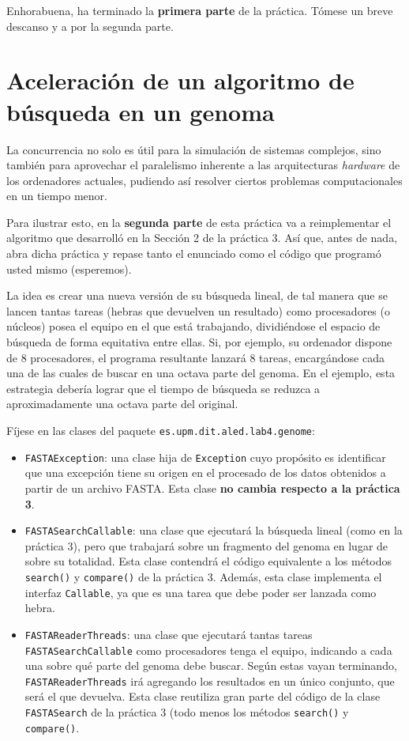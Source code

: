 \documentclass[10pt,a4paper,spanish]{article}
\newcommand{\code}[1]{\texttt{#1}}
\begin{document}
Enhorabuena, ha terminado la \textbf{primera parte} de la práctica. Tómese un breve descanso y a por la segunda parte.

\section{Aceleración de un algoritmo de búsqueda en un genoma}
\label{sec:paralelizacion}

La concurrencia no solo es útil para la simulación de sistemas complejos, sino también para aprovechar el paralelismo inherente a las arquitecturas \textit{hardware} de los ordenadores actuales, pudiendo así resolver ciertos problemas computacionales en un tiempo menor.

Para ilustrar esto, en la \textbf{segunda parte} de esta práctica va a reimplementar el algoritmo que desarrolló en la Sección 2 de la práctica 3. Así que, antes de nada, abra dicha práctica y repase tanto el enunciado como el código que programó usted mismo (esperemos).

La idea es crear una nueva versión de su búsqueda lineal, de tal manera que se lancen tantas tareas (hebras que devuelven un resultado) como procesadores (o núcleos) posea el equipo en el que está trabajando, dividiéndose el espacio de búsqueda de forma equitativa entre ellas. Si, por ejemplo, su ordenador dispone de 8 procesadores, el programa resultante lanzará 8 tareas, encargándose cada una de las cuales de buscar en una octava parte del genoma. En el ejemplo, esta estrategia debería lograr que el tiempo de búsqueda se reduzca a aproximadamente una octava parte del original.

Fíjese en las clases del paquete \code{es.upm.dit.aled.lab4.genome}:

\begin{itemize}
    \item \code{FASTAException}: una clase hija de \code{Exception} cuyo propósito es identificar que una excepción tiene su origen en el procesado de los datos obtenidos a partir de un archivo FASTA. Esta clase \textbf{no cambia respecto a la práctica 3}.
    \item \code{FASTASearchCallable}: una clase que ejecutará la búsqueda lineal (como en la práctica 3), pero que trabajará sobre un fragmento del genoma en lugar de sobre su totalidad. Esta clase contendrá el código equivalente a los métodos \code{search()} y \code{compare()} de la práctica 3. Además, esta clase implementa el interfaz \code{Callable}, ya que es una tarea que debe poder ser lanzada como hebra.
    \item \code{FASTAReaderThreads}: una clase que ejecutará tantas tareas \code{FASTASearchCallable} como procesadores tenga el equipo, indicando a cada una sobre qué parte del genoma debe buscar. Según estas vayan terminando, \code{FASTAReaderThreads} irá agregando los resultados en un único conjunto, que será el que devuelva. Esta clase reutiliza gran parte del código de la clase \code{FASTASearch} de la práctica 3 (todo menos los métodos \code{search()} y \code{compare()}.
\end{itemize}
\end{document}

